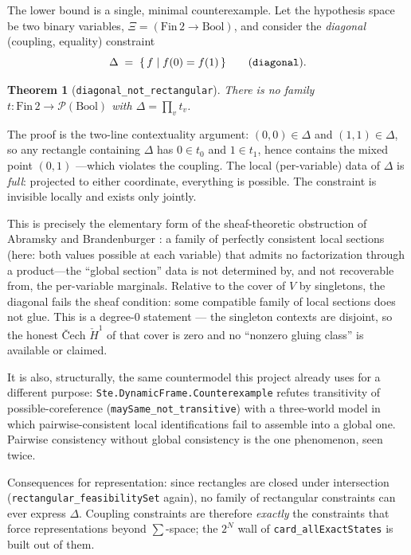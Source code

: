 \documentclass[11pt]{article}
\newtheorem{theorem}{Theorem}
\newcommand{\lean}[1]{\texttt{#1}}
\newcommand{\Xii}{\Xi}
\begin{document}
The lower bound is a single, minimal counterexample.  Let the
hypothesis space be two binary variables, $\Xii = (\mathrm{Fin}\,2 \to
\mathrm{Bool})$, and consider the \emph{diagonal} (coupling,
equality) constraint
\[
  \Delta \;=\; \{\, f \mid f(0) = f(1) \,\}
  \qquad (\text{\lean{diagonal}}).
\]

\begin{theorem}[\lean{diagonal\_not\_rectangular}]
There is no family $t : \mathrm{Fin}\,2 \to
\mathcal{P}(\mathrm{Bool})$ with $\Delta = \prod_v t_v$.
\end{theorem}

The proof is the two-line contextuality argument: $(0,0) \in \Delta$
and $(1,1) \in \Delta$, so any rectangle containing $\Delta$ has
$0 \in t_0$ and $1 \in t_1$, hence contains the mixed point $(0,1)$
---which violates the coupling.  The local (per-variable) data of
$\Delta$ is \emph{full}: projected to either coordinate, everything is
possible.  The constraint is invisible locally and exists only
jointly.

This is precisely the elementary form of the sheaf-theoretic
obstruction of Abramsky and Brandenburger \citep{abramsky2011sheaf}:
a family of perfectly consistent local sections (here: both values
possible at each variable) that admits no factorization through a
product---the ``global section'' data is not determined by, and not
recoverable from, the per-variable marginals.  Relative to the cover of
$V$ by singletons, the diagonal fails the sheaf condition: some
compatible family of local sections does not glue.  This is a
degree-$0$ statement --- the singleton contexts are disjoint, so the
honest \v{C}ech $\check{H}^1$ of that cover is zero and no
``nonzero gluing class'' is available or claimed.

It is also, structurally, the same countermodel this project already
uses for a different purpose: \lean{Ste.DynamicFrame.Counterexample}
refutes transitivity of possible-coreference
(\lean{maySame\_not\_transitive}) with a three-world model in which
pairwise-consistent local identifications fail to assemble into a
global one.  Pairwise consistency without global consistency is the
one phenomenon, seen twice.

Consequences for representation: since rectangles are closed under
intersection (\lean{rectangular\_feasibilitySet} again), no family of
rectangular constraints can ever express $\Delta$.  Coupling
constraints are therefore \emph{exactly} the constraints that force
representations beyond $\sum$-space; the $2^N$ wall of
\lean{card\_allExactStates} is built out of them.
\end{document}
